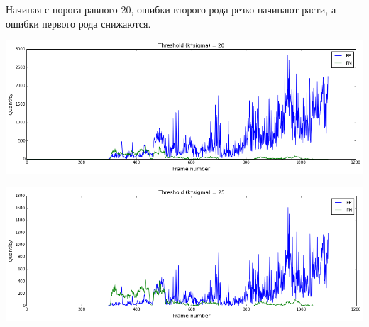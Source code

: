\documentclass[12pt, a4paper]{article}
\begin{document}
			Начиная с порога равного 20, ошибки второго рода резко начинают расти, а ошибки первого рода снижаются.
			\begin{center}
				\includegraphics[width=17cm]{1par_k_20.png}
			\end{center}
			\begin{center}
				\includegraphics[width=17cm]{1par_k_25.png}
			\end{center}
\end{document}
